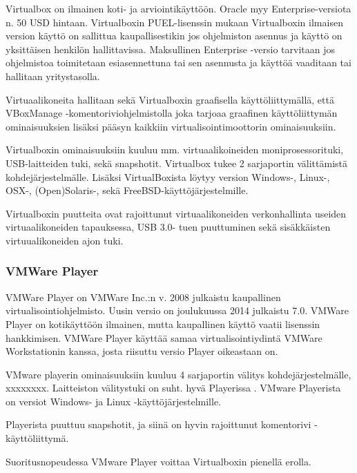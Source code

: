 Virtualbox on ilmainen koti- ja arviointikäyttöön. Oracle myy Enterprise-versiota n. 50 USD hintaan.
Virtualboxin PUEL-lisenssin mukaan Virtualboxin ilmaisen version käyttö on sallittua kaupallisestikin jos ohjelmiston asennus ja käyttö on yksittäisen henkilön hallittavissa. Maksullinen Enterprise -versio tarvitaan jos ohjelmistoa toimitetaan esiasennettuna tai sen asennusta ja käyttöä vaaditaan tai hallitaan yritystasolla.

Virtuaalikoneita hallitaan sekä Virtualboxin graafisella käyttöliittymällä, että VBoxManage -komentoriviohjelmistolla joka tarjoaa graafinen käyttöliittymän ominaisuuksien lisäksi pääsyn kaikkiin virtualisointimoottorin ominaisuuksiin.


Virtualboxin ominaisuuksiin kuuluu mm. virtuaalikoineiden moniprosessorituki, USB-laitteiden tuki, sekä snapshotit. Virtualbox tukee 2 sarjaportin välittämistä kohdejärjestelmälle. Lisäksi VirtualBoxista löytyy version Windows-, Linux-, OSX-, (Open)Solaris-, sekä FreeBSD-käyttöjärjestelmille.

Virtualboxin puutteita ovat rajoittunut virtuaalikoneiden verkonhallinta useiden virtuaalikoneiden tapauksessa, USB 3.0- tuen puuttuminen sekä sisäkkäisten virtuualikoneiden ajon tuki.


\subsubsection{VMWare Player}
VMWare Player on VMWare Inc.:n v. 2008 julkaistu kaupallinen virtualisointiohjelmisto. Uusin versio on joulukuussa 2014 julkaistu 7.0. VMWare Player on kotikäyttöön ilmainen, mutta kaupallinen käyttö vaatii lisenssin hankkimisen. VMWare Player käyttää samaa virtualisointiydintä VMWare Workstationin kanssa, josta riisuttu versio Player oikeastaan on.

VMware playerin ominaisuuksiin kuuluu 4 sarjaportin välitys kohdejärjestelmälle, xxxxxxxx. Laitteiston välitystuki on suht. hyvä Playerissa . VMware Playerista on versiot Windows- ja Linux -käyttöjärjestelmille.

Playerista puuttuu snapshotit, ja siinä on hyvin rajoittunut komentorivi -käyttöliittymä.

Suoritusnopeudessa VMware Player voittaa Virtualboxin pienellä erolla.\cite{vplayervsvbox}



